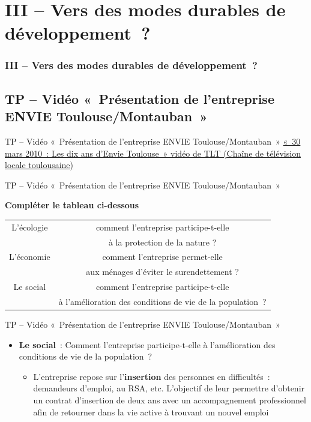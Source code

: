 \documentclass[C]{beamer}
\begin{document}
	\section*{III -- Vers des modes durables de développement~?}
	\begin{frame}
	\frametitle{III -- Vers des modes durables de développement~?}
	\end{frame}
	
	\subsection*{TP -- Vidéo «~Présentation de l'entreprise ENVIE Toulouse/Montauban~»}
	\begin{frame}{TP -- Vidéo «~Présentation de l'entreprise ENVIE Toulouse/Montauban~»}
	\href{http://www.envie-midipyrenees.com/les-dix-ans-denvie-toulouse/}{«~30 mars 2010~: Les dix ans d'Envie Toulouse~» vidéo de TLT (Chaîne de télévision locale toulousaine)}
	\end{frame}
	
	\begin{frame}{TP -- Vidéo «~Présentation de l'entreprise ENVIE Toulouse/Montauban~»}
	\begin{center}
	\textbf{Compléter le tableau ci-dessous}
	\end{center}
	\begin{tabular}{|c|c|}
	\hline
L'écologie & comment l'entreprise participe-t-elle \\ & à la protection de la nature ? \\
	\hline
L'économie & comment l'entreprise permet-elle\\ & aux ménages d'éviter le surendettement ?\\
	\hline
Le social & comment l'entreprise participe-t-elle\\ & à l'amélioration des conditions de vie de la population~?\\
	\hline
	\end{tabular}
	\end{frame}	
	
	\begin{frame}{TP -- Vidéo «~Présentation de l'entreprise ENVIE Toulouse/Montauban~»}
	\begin{itemize}
	\item \textbf{Le social}~: Comment l'entreprise participe-t-elle à l'amélioration des conditions de vie de la population~?\\
\pause
		\begin{itemize}
		\item L'entreprise repose sur l'\textbf{insertion} des personnes en difficultés~: demandeurs d'emploi, au RSA, etc. L'objectif de leur permettre d'obtenir un contrat d'insertion de deux ans avec un accompagnement professionnel afin de retourner dans la vie active à trouvant un nouvel emploi
		\end{itemize}
	\end{itemize}
	\end{frame}
	
\end{document}
